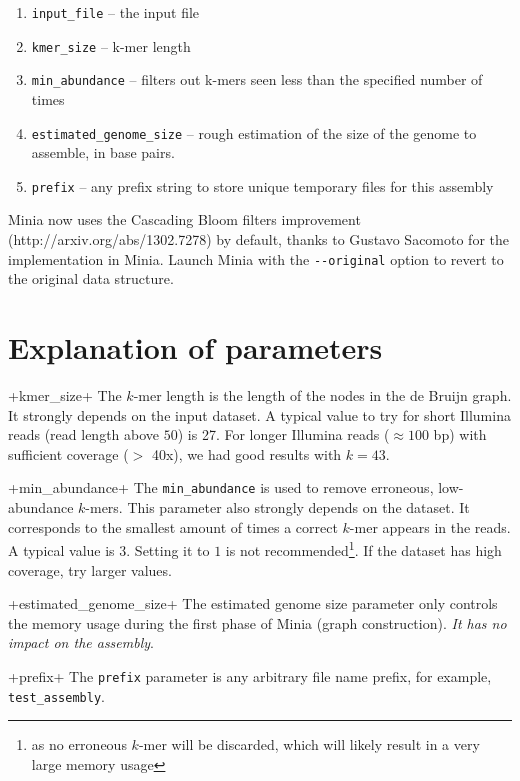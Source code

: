\documentclass[a4paper]{article}
\begin{document}
\begin{enumerate}

\item \verb+input_file+ -- the input file

\item \verb+kmer_size+  -- k-mer length 

\item \verb+min_abundance+ -- filters out k-mers seen less than the specified number of times

\item \verb+estimated_genome_size+ -- rough estimation of the size of the genome to assemble, in base pairs.

\item \verb+prefix+ -- any prefix string to store unique temporary files for this assembly

\end{enumerate}

Minia now uses the Cascading Bloom filters improvement (http://arxiv.org/abs/1302.7278) by default, thanks to Gustavo Sacomoto for the implementation in Minia. Launch Minia with the \verb!--original! option to revert to the original data structure.


\section{Explanation of parameters}
\begin{description}

\vitem+kmer_size+
The $k$-mer length is the length of the nodes in the de Bruijn graph. It strongly depends on the input dataset. A typical value to try for short Illumina reads (read length above $50$) is 27. For longer Illumina reads ($\approx 100$ bp) with sufficient coverage ($>$ 40x), we had good results with $k=43$.

\vitem+min_abundance+
The \verb+min_abundance+ is used to remove erroneous, low-abundance $k$-mers. This parameter also strongly depends on the dataset. It corresponds to the smallest amount of times a correct $k$-mer appears in the reads. A typical value is $3$. Setting it to $1$ is not recommended\footnote{as no erroneous $k$-mer will be discarded, which will likely result in a very large memory usage}. If the dataset has high coverage, try larger values.

\vitem+estimated_genome_size+
The estimated genome size parameter only controls the memory usage during the first phase of Minia (graph construction). \emph{It has no impact on the assembly}.

\vitem+prefix+
The \verb+prefix+ parameter is any arbitrary file name prefix, for example, \verb+test_assembly+.

\end{description}
\end{document}
